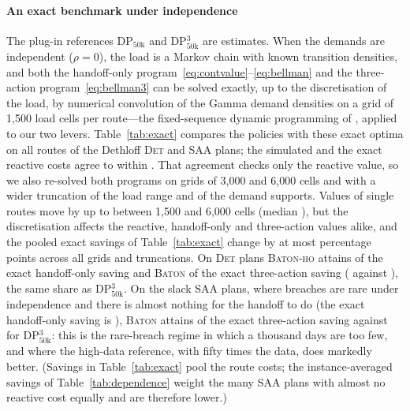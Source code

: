 \documentclass[preprint,authoryear,12pt]{elsarticle}
\theoremstyle{definition}
\theoremstyle{remark}
\begin{document}
\paragraph{An exact benchmark under independence} The plug-in
references DP$_{50\mathrm{k}}$ and DP$^3_{50\mathrm{k}}$ are estimates.
When the demands are independent ($\rho = 0$), the load is a Markov
chain with known transition densities, and both the handoff-only
program~\eqref{eq:contvalue}--\eqref{eq:bellman} and the three-action
program~\eqref{eq:bellman3} can be solved exactly, up to the
discretisation of the load, by numerical convolution of the Gamma demand
densities on a grid of 1{,}500 load cells per route---the fixed-sequence
dynamic programming of \citet{minis2011stochastic}, applied to our two
levers. Table~\ref{tab:exact} compares the policies with these exact
optima on all routes of the Dethloff \textsc{Det} and \textsc{SAA}
plans; the simulated and the exact reactive costs agree to within
\exDetMcErr. That agreement checks only the reactive value, so we also
re-solved both programs on grids of 3{,}000 and 6{,}000 cells and with a
wider truncation of the load range and of the demand supports. Values
of single routes move by up to \gridCoarseThreeMax{} between 1{,}500
and 6{,}000 cells (median \gridCoarseThreeMedian), but the
discretisation affects the reactive, handoff-only and three-action
values alike, and the pooled exact savings of Table~\ref{tab:exact}
change by at most \gridPooledMaxDiff{} percentage points across all
grids and truncations. On \textsc{Det} plans
\textsc{Baton-ho} attains \exDetShareHo{} of the exact handoff-only
saving and \textsc{Baton} \exDetShare{} of the exact three-action saving
(\exDetBaton{} against \exDetThree), the same share as
DP$^3_{50\mathrm{k}}$. On the slack \textsc{SAA} plans, where breaches
are rare under independence and there is almost nothing for the handoff
to do (the exact handoff-only saving is \exSaaHo), \textsc{Baton}
attains \exSaaShare{} of the exact three-action saving against
\exSaaShareDp{} for DP$^3_{50\mathrm{k}}$: this is the rare-breach
regime in which a thousand days are too few, and where the high-data
reference, with fifty times the data, does markedly better. (Savings in
Table~\ref{tab:exact} pool the route costs; the instance-averaged
savings of Table~\ref{tab:dependence} weight the many \textsc{SAA} plans
with almost no reactive cost equally and are therefore lower.)


\end{document}
